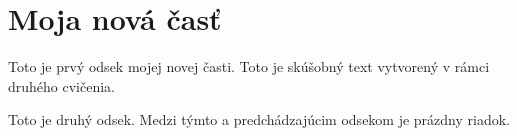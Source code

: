 \documentclass[10pt,twoside,slovak,a4paper]{coursepaper}
\begin{document}
\section{Moja nová časť}

Toto je prvý odsek mojej novej časti. Toto je skúšobný text vytvorený v rámci druhého cvičenia.


Toto je druhý odsek. Medzi týmto a predchádzajúcim odsekom je prázdny riadok.





\end{document}
